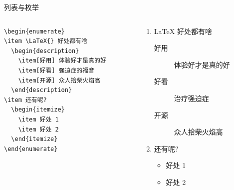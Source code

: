 \begin{frame}[fragile]{列表与枚举}
\begin{columns}
\begin{column}{.6\textwidth}
\begin{lstlisting}[basicstyle=\ttfamily\small]
\begin{enumerate}
\item \LaTeX{} 好处都有啥
  \begin{description}
    \item[好用] 体验好才是真的好
    \item[好看] 强迫症的福音
    \item[开源] 众人拾柴火焰高
  \end{description}
\item 还有呢?
  \begin{itemize}
    \item 好处 1
    \item 好处 2
  \end{itemize}
\end{enumerate}
\end{lstlisting}
\end{column}
\begin{column}{.4\textwidth}
{\small
\begin{enumerate}
\item \LaTeX{} 好处都有啥
  \begin{description}
    \item[好用] 体验好才是真的好
    \item[好看] 治疗强迫症
    \item[开源] 众人拾柴火焰高
  \end{description}
\item 还有呢?
  \begin{itemize}
    \item 好处 1
    \item 好处 2
  \end{itemize}
\end{enumerate}
}
\end{column}
\end{columns}

\end{frame}


